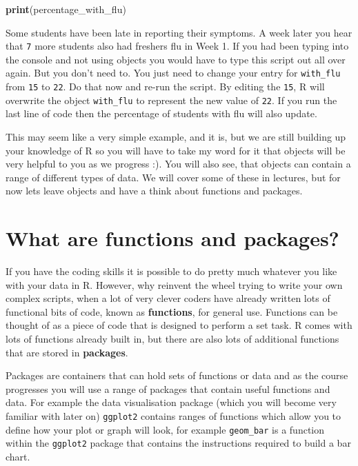 \documentclass[
]{book}
\newenvironment{Shaded}{\begin{snugshade}}{\end{snugshade}}
\newcommand{\FunctionTok}[1]{\textcolor[rgb]{0.13,0.29,0.53}{\textbf{#1}}}
\newcommand{\NormalTok}[1]{#1}
\begin{document}
\begin{Shaded}
\begin{Highlighting}[]
\FunctionTok{print}\NormalTok{(percentage\_with\_flu)}
\end{Highlighting}
\end{Shaded}

Some students have been late in reporting their symptoms. A week later you hear that \texttt{7} more students also had freshers flu in Week 1. If you had been typing into the console and not using objects you would have to type this script out all over again. But you don't need to. You just need to change your entry for \texttt{with\_flu} from \texttt{15} to \texttt{22}. Do that now and re-run the script. By editing the \texttt{15}, R will overwrite the object \texttt{with\_flu} to represent the new value of \texttt{22}. If you run the last line of code then the percentage of students with flu will also update.

This may seem like a very simple example, and it is, but we are still building up your knowledge of R so you will have to take my word for it that objects will be very helpful to you as we progress :). You will also see, that objects can contain a range of different types of data. We will cover some of these in lectures, but for now lets leave objects and have a think about functions and packages.

\hypertarget{what-are-functions-and-packages}{%
\section{What are functions and packages?}\label{what-are-functions-and-packages}}

If you have the coding skills it is possible to do pretty much whatever you like with your data in R. However, why reinvent the wheel trying to write your own complex scripts, when a lot of very clever coders have already written lots of functional bits of code, known as \textbf{functions}, for general use. Functions can be thought of as a piece of code that is designed to perform a set task. R comes with lots of functions already built in, but there are also lots of additional functions that are stored in \textbf{packages}.

Packages are containers that can hold sets of functions or data and as the course progresses you will use a range of packages that contain useful functions and data. For example the data visualisation package (which you will become very familiar with later on) \texttt{ggplot2} contains ranges of functions which allow you to define how your plot or graph will look, for example \texttt{geom\_bar} is a function within the \texttt{ggplot2} package that contains the instructions required to build a bar chart.
\end{document}
